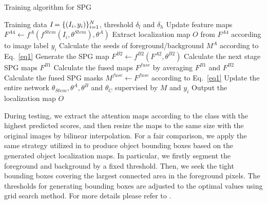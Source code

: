 \documentclass[runningheads]{llncs}
\begin{document}
\begin{algorithm}
\small
\caption{Training algorithm for SPG}
\label{alg1}
\begin{algorithmic}[1]
\INPUT Training data $\emph{I}=\{(I_i, y_i)\}_{i=1}^N$, threshold $\delta_l$ and $\delta_h$
\STATE Update feature maps $F^{A4} \leftarrow  f^{A}(f^{Stem}(I_i,\theta^{Stem}),\theta^{A})$
\STATE Extract localization map $O$ from $F^{A4}$ according to image label $y_i$
\STATE Calculate the seeds of foreground/background $M^A$ according to Eq.~\eqref{eq1}
\STATE Generate the SPG map $F^{B2} \leftarrow f^{B2}(F^{A2}, \theta^{B2})$
\STATE Calculate the next stage SPG maps $F^{B1}$
\STATE Calculate the fused maps $F^{fuse}$ by averaging $F^{B1}$ and $F^{B2}$
\STATE Calculate the fused SPG masks $M^{fuse} \leftarrow F^{fuse}$ according to Eq.~\eqref{eq1}
\STATE Update the entire network $\theta_{Stem}, \theta^A, \theta^B$ and $\theta_C$ supervised by $M$ and $y_i$
\ENDWHILE
\OUTPUT Output the localization map $O$
\end{algorithmic}
\end{algorithm}

During testing, we extract the attention maps according to the class with the highest predicted scores, and then resize the maps to the same size with the original images by bilinear interpolation.
For a fair comparison, we apply the same strategy utilized in \cite{zhou2015cnnlocalization} to produce object bounding boxes based on the generated object localization maps.
In particular, we firstly segment the foreground and background by a fixed threshold.
Then, we seek the tight bounding boxes covering the largest connected area in the foreground pixels.
The thresholds for generating bounding boxes are adjusted to the optimal values using grid search method.
For more details please refer to \cite{zhou2015cnnlocalization}.
\end{document}
